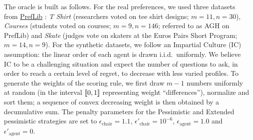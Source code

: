 \documentclass[runningheads]{llncs}
\begin{document}
The oracle is built as follows. 
For the real preferences, we used three datasets from \href{https://www.preflib.org/}{PrefLib} \cite{PrefLib}: \textit{T Shirt} (researchers voted on tee shirt designs; $m \!=\! 11, n \!=\! 30$),
\textit{Courses}  (students voted on courses; $m \!=\! 9, n \!=\! 146$; referred to as AGH on PrefLib)
and \emph{Skate} (judges vote on skaters at the Euros Pairs Short Program; $m \!=\! 14, n \!=\! 9$).
For the synthetic datasets, we follow an Impartial Culture (IC) assumption: the linear order of each agent is drawn i.i.d.\ uniformly.
We believe IC to be a challenging situation and expect the number of questions to ask, in order to reach a certain level of regret, to decrease with less varied profiles.
To generate the weights of the scoring rule, we first draw $m \!-\! 1$ numbers uniformly at random (in the interval $\llbracket 0,1 \rrbracket$ representing weight ``differences''), normalize and sort them; a sequence of convex decreasing weight is then obtained by a decumulative sum. The penalty parameters for the Pessimistic and Extended pessimistic strategies are set to  $\epsilon_{\text{chair}} = 1.1$, $\epsilon'_{\text{chair}} = 10^{-6}$, $\epsilon_{\text{agent}} = 1.0$ and $\epsilon'_{\text{agent}} = 0$.
\end{document}
